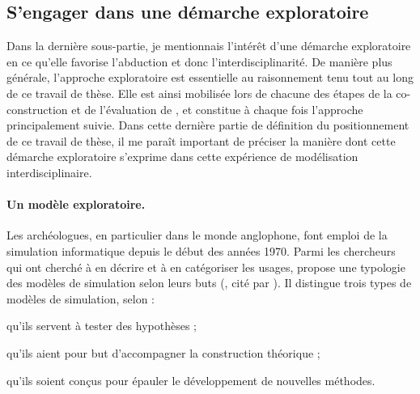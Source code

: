 \subsection{S'engager dans une démarche exploratoire}

Dans la dernière sous-partie, je mentionnais l'intérêt d'une démarche exploratoire en ce qu'elle favorise l'abduction et donc l'interdisciplinarité.
De manière plus générale, l'approche exploratoire est essentielle au raisonnement tenu tout au long de ce travail de thèse.
Elle est ainsi mobilisée lors de chacune des étapes de la co-construction et de l'évaluation de \simfeodal{}, et constitue à chaque fois l'approche principalement suivie.
Dans cette dernière partie de définition du positionnement de ce travail de thèse, il me paraît important de préciser la manière dont cette démarche exploratoire s'exprime dans cette expérience de modélisation interdisciplinaire.

\paragraph{Un modèle exploratoire.}

Les archéologues, en particulier dans le monde anglophone, font emploi de la simulation informatique depuis le début des années 1970.
Parmi les chercheurs qui ont cherché à en décrire et à en catégoriser les usages, \citeauthor{mithen2018simulating} propose une typologie des modèles de simulation selon leurs buts (\cite[ pp.~176--177]{mithen2018simulating}, cité par \cite[260]{lake_trends_2014}).
Il distingue trois types de modèles de simulation, selon :
\begin{compactenum}\vspace*{-0.5em}
	\item qu'ils servent à tester des hypothèses ;
	\item qu'ils aient pour but d'accompagner la construction théorique ;
	\item qu'ils soient conçus pour épauler le développement de nouvelles méthodes.
\end{compactenum}\vspace*{-0.5em}

